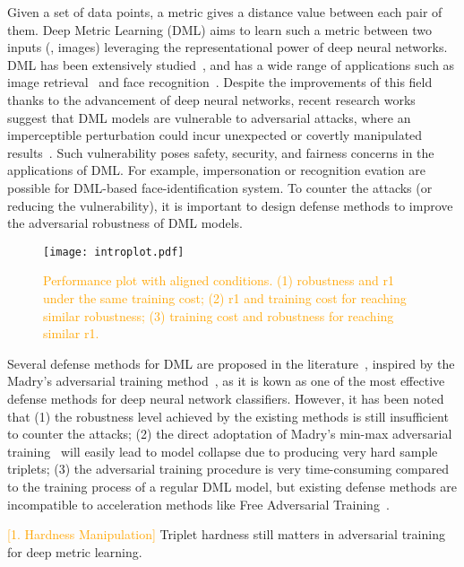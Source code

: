 \documentclass[10pt,twocolumn,letterpaper]{article}
\newcommand{\oo}[1]{\textcolor{orange}{#1}}
\begin{document}

Given a set of data points, a metric gives a distance value between each pair
of them.
%
Deep Metric Learning (DML) aims to learn such a metric between two inputs (\eg,
images) leveraging the representational power of deep neural networks.
%
DML has been extensively studied~\cite{revisiting}, and has a
wide range of applications such
as image retrieval~\cite{imagesim2} and face recognition~\cite{facenet,domainface}.
%
Despite the improvements of this field thanks to the advancement of deep neural
networks, recent research works suggest that DML models are vulnerable to
adversarial attacks, where an imperceptible perturbation could incur unexpected
or covertly manipulated results~\cite{advrank,advorder}.
%
Such vulnerability poses safety, security, and fairness concerns in the
applications of DML.
%
For example, impersonation or recognition evation are possible for DML-based
face-identification system.
%
To counter the attacks (or reducing the vulnerability), it is important to
design defense methods to improve the adversarial robustness of DML models.

\begin{figure}[t]
	\texttt{[image: introplot.pdf]}
	\caption{\oo{Performance plot with aligned conditions.
	(1) robustness and r1 under the same training cost;
	(2) r1 and training cost for reaching similar robustness;
	(3) training cost and robustness for reaching similar r1.}}
	\label{fig:introplot}
\end{figure}

Several defense methods for DML are proposed in the
literature~\cite{advrank,robrank}, inspired by the Madry's adversarial training
method~\cite{madry}, as it is kown as one of the most effective defense methods
for deep neural network classifiers.
%
However, it has been noted that
%
(1) the robustness level achieved by the existing methods is still insufficient
to counter the attacks;
%
(2) the direct adoptation of Madry's min-max adversarial training~\cite{madry} will easily
lead to model collapse due to producing very hard sample triplets;
%
(3) the adversarial training procedure is very time-consuming compared to
the training process of a regular DML model, but existing defense methods
are incompatible to acceleration methods like Free Adversarial Training~\cite{freeat}.

\oo{[1. Hardness Manipulation]}
Triplet hardness still matters in adversarial training for deep metric
learning.
\end{document}
